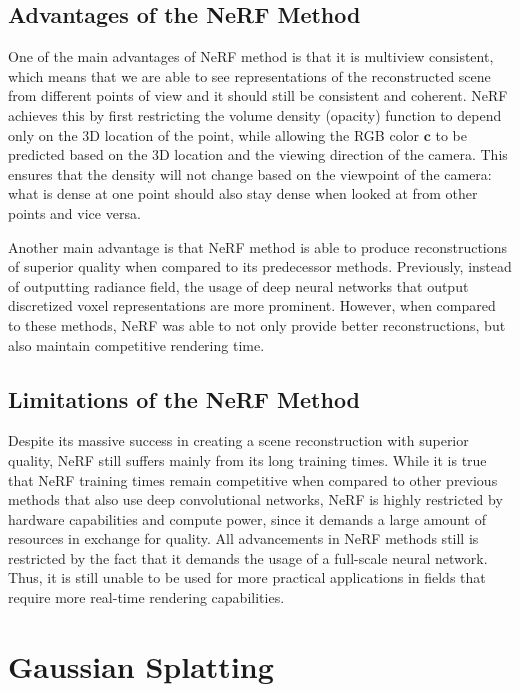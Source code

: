 \subsection{Advantages of the NeRF Method}

One of the main advantages of NeRF method is that it is multiview consistent, which means that we are able to see representations of the reconstructed scene from different points of view and it should still be consistent and coherent. NeRF achieves this by first restricting the volume density (opacity) function to depend only on the 3D location of the point, while allowing the RGB color \(\mathbf{c}\) to be predicted based on the 3D location and the viewing direction of the camera. This ensures that the density will not change based on the viewpoint of the camera: what is dense at one point should also stay dense when looked at from other points and vice versa.

Another main advantage is that NeRF method is able to produce reconstructions of superior quality when compared to its predecessor methods. Previously, instead of outputting radiance field, the usage of deep neural networks that output discretized voxel representations are more prominent. However, when compared to these methods, NeRF was able to not only provide better reconstructions, but also maintain competitive rendering time.

\subsection{Limitations of the NeRF Method}

Despite its massive success in creating a scene reconstruction with superior quality, NeRF still suffers mainly from its long training times. While it is true that NeRF training times remain competitive when compared to other previous methods that also use deep convolutional networks, NeRF is highly restricted by hardware capabilities and compute power, since it demands a large amount of resources in exchange for quality. All advancements in NeRF methods still is restricted by the fact that it demands the usage of a full-scale neural network. Thus, it is still unable to be used for more practical applications in fields that require more real-time rendering capabilities.

\section{Gaussian Splatting} 


